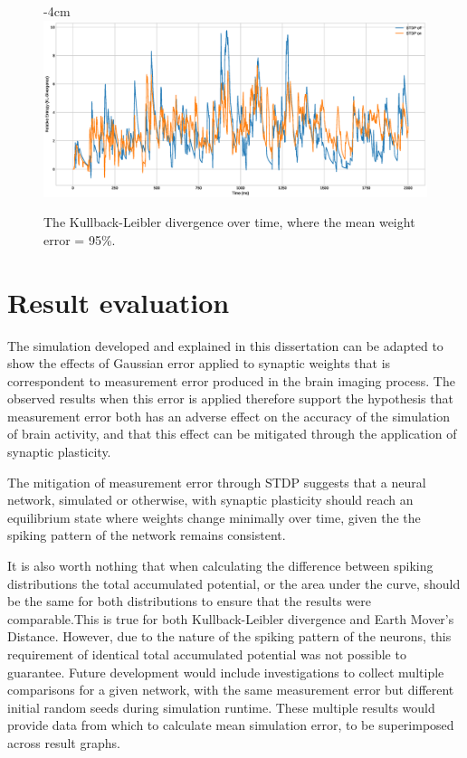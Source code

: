 \begin{figure}[h!]
    \centering
    \addtolength{\leftskip} {-4cm}
    \addtolength{\rightskip}{-4cm}
    \includegraphics[width=1.6\linewidth]{figures/graphs/RESULT2.eps}
    \caption[KL divergence over time, mean weight error = 95\%]{The Kullback-Leibler divergence over time, where the mean weight error = 95\%.}
    \label{fig:RES2}
\end{figure}
\FloatBarrier

\section{Result evaluation}

The simulation developed and explained in this dissertation can be adapted to
show the effects of Gaussian error applied to synaptic weights that is
correspondent to measurement error produced in the brain imaging process. The
observed results when this error is applied therefore support the hypothesis
that measurement error both has an adverse effect on the accuracy of the
simulation of brain activity, and that this effect can be mitigated through the
application of synaptic plasticity.

The mitigation of measurement error through STDP suggests that a neural
network, simulated or otherwise, with synaptic plasticity should reach an
equilibrium state where weights change minimally over time, given the the
spiking pattern of the network remains consistent.

It is also worth nothing that when calculating the difference between spiking
distributions the total accumulated potential, or the area under the curve,
should be the same for both distributions to ensure that the results were
comparable.This is true for both Kullback-Leibler divergence and Earth Mover's
Distance. However, due to the nature of the spiking pattern of the neurons, this
requirement of identical total accumulated potential
was not possible to guarantee. Future development would include investigations
to collect multiple comparisons for a given network, with the same measurement
error but different initial random seeds during simulation runtime. These
multiple results would provide data from which to calculate mean simulation
error, to be superimposed across result graphs.


